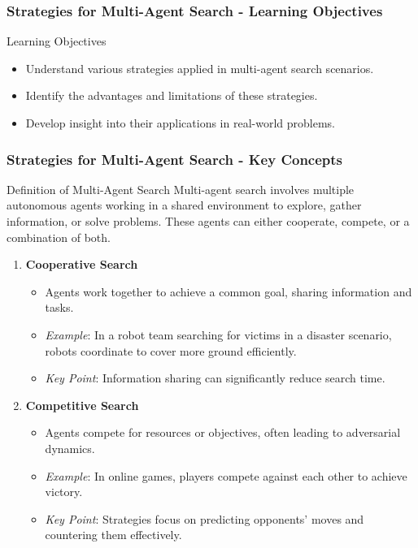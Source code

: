 \documentclass[aspectratio=169]{beamer}
\begin{document}
\begin{frame}[fragile]
    \frametitle{Strategies for Multi-Agent Search - Learning Objectives}
    \begin{block}{Learning Objectives}
        \begin{itemize}
            \item Understand various strategies applied in multi-agent search scenarios.
            \item Identify the advantages and limitations of these strategies.
            \item Develop insight into their applications in real-world problems.
        \end{itemize}
    \end{block}
\end{frame}

\begin{frame}[fragile]
    \frametitle{Strategies for Multi-Agent Search - Key Concepts}
    \begin{block}{Definition of Multi-Agent Search}
        Multi-agent search involves multiple autonomous agents working in a shared environment to explore, gather information, or solve problems. These agents can either cooperate, compete, or a combination of both.
    \end{block}
    
    \begin{enumerate}
        \item \textbf{Cooperative Search}
            \begin{itemize}
                \item Agents work together to achieve a common goal, sharing information and tasks.
                \item \textit{Example}: In a robot team searching for victims in a disaster scenario, robots coordinate to cover more ground efficiently.
                \item \textit{Key Point}: Information sharing can significantly reduce search time.
            \end{itemize}
        
        \item \textbf{Competitive Search}
            \begin{itemize}
                \item Agents compete for resources or objectives, often leading to adversarial dynamics.
                \item \textit{Example}: In online games, players compete against each other to achieve victory.
                \item \textit{Key Point}: Strategies focus on predicting opponents' moves and countering them effectively.
            \end{itemize}
        

\end{enumerate}
\end{frame}
\end{document}

